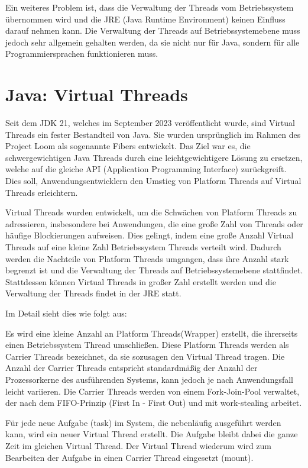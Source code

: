 \documentclass[fontsize=12pt,paper=a4,twoside=semi,parskip=half-,headsepline,headinclude]{scrreprt}
\begin{document}
Ein weiteres Problem ist, dass die Verwaltung der Threads vom Betriebssystem über\-nommen wird und die JRE (Java Runtime Environment) keinen Einfluss darauf nehmen kann. Die Verwaltung der Threads auf Betriebssystemebene muss jedoch sehr allgemein gehalten werden, da sie nicht nur für Java, sondern für alle Programmiersprachen funktionieren muss.

\section{Java: Virtual Threads}

Seit dem JDK 21, welches im September 2023 veröffentlicht wurde, sind Virtual Threads ein fester Bestandteil von Java. Sie wurden ursprünglich im Rahmen des Project Loom \cite{loom2024} als sogenannte Fibers entwickelt. Das Ziel war es, die schwergewichtigen Java Threads durch eine leichtgewichtigere Lösung zu ersetzen, welche auf die gleiche API (Application Programming Interface) zurückgreift. Dies soll, Anwendungsentwicklern den Umstieg von Platform Threads auf Virtual Threads erleichtern.

Virtual Threads wurden entwickelt, um die Schwächen von Platform Threads zu adressieren, insbesondere bei Anwendungen, die eine große Zahl von Threads oder häufige Blockierungen aufweisen. Dies gelingt, indem eine große Anzahl Virtual Threads auf eine kleine Zahl Betriebssystem Threads verteilt wird. Dadurch werden die Nachteile von Platform Threads umgangen, dass ihre Anzahl stark begrenzt ist und die Verwaltung der Threads auf Betriebssystemebene stattfindet. Stattdessen können Virtual Threads in großer Zahl erstellt werden und die Verwaltung der Threads findet in der JRE statt.

Im Detail sieht dies wie folgt aus:

Es wird eine kleine Anzahl an Platform Threads(Wrapper) erstellt, die ihrerseits einen Betriebssystem Thread umschließen. Diese Platform Threads werden als Carrier Threads bezeichnet, da sie sozusagen den Virtual Thread tragen. Die Anzahl der Carrier Threads entspricht standardmäßig der Anzahl der Prozessorkerne des ausführenden Systems, kann jedoch je nach Anwendungsfall leicht variieren. Die Carrier Threads werden von einem Fork-Join-Pool verwaltet, der nach dem FIFO-Prinzip (First In - First Out) und mit work-stealing arbeitet.\cite{Pressler2023a}

Für jede neue Aufgabe (task) im System, die nebenläufig ausgeführt werden kann, wird ein neuer Virtual Thread erstellt. Die Aufgabe bleibt dabei die ganze Zeit im gleichen Virtual Thread. Der Virtual Thread wiederum wird zum Bearbeiten der Aufgabe in einen Carrier Thread eingesetzt (mount). 
\end{document}
